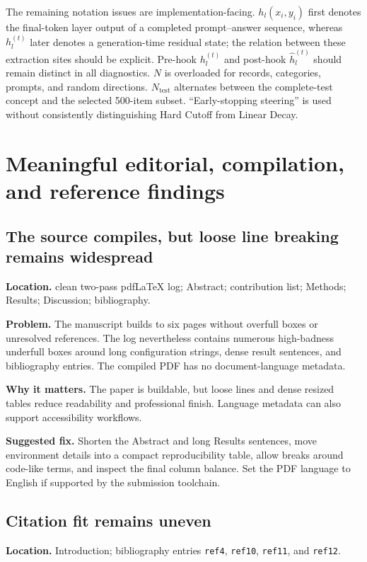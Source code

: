 \documentclass[11pt]{article}
\newcommand{\findinglabel}[1]{\textbf{#1}}
\begin{document}
The remaining notation issues are implementation-facing.  $h_l(x_i,y_i)$ first denotes the final-token layer output of a completed prompt--answer sequence, whereas $h_l^{(t)}$ later denotes a generation-time residual state; the relation between these extraction sites should be explicit.  Pre-hook $h_l^{(t)}$ and post-hook $\hat h_l^{(t)}$ should remain distinct in all diagnostics.  $N$ is overloaded for records, categories, prompts, and random directions.  $N_{\text{test}}$ alternates between the complete-test concept and the selected 500-item subset.  ``Early-stopping steering'' is used without consistently distinguishing Hard Cutoff from Linear Decay.

\section*{Meaningful editorial, compilation, and reference findings}

\subsection*{The source compiles, but loose line breaking remains widespread}

\findinglabel{Location.} clean two-pass pdfLaTeX log; Abstract; contribution list; Methods; Results; Discussion; bibliography.

\findinglabel{Problem.} The manuscript builds to six pages without overfull boxes or unresolved references.  The log nevertheless contains numerous high-badness underfull boxes around long configuration strings, dense result sentences, and bibliography entries.  The compiled PDF has no document-language metadata.

\findinglabel{Why it matters.} The paper is buildable, but loose lines and dense resized tables reduce readability and professional finish.  Language metadata can also support accessibility workflows.

\findinglabel{Suggested fix.} Shorten the Abstract and long Results sentences, move environment details into a compact reproducibility table, allow breaks around code-like terms, and inspect the final column balance.  Set the PDF language to English if supported by the submission toolchain.

\subsection*{Citation fit remains uneven}

\findinglabel{Location.} Introduction; bibliography entries \texttt{ref4}, \texttt{ref10}, \texttt{ref11}, and \texttt{ref12}.
\end{document}
